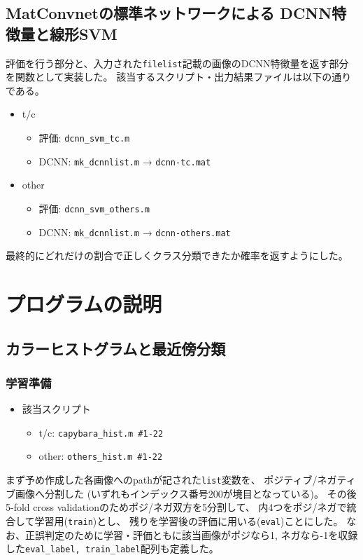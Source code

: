 \documentclass[11pt,a4paper, uplatex]{jsreport}
\begin{document}
\subsection{MatConvnetの標準ネットワークによる DCNN特徴量と線形SVM}\label{sec:defdcnn}
評価を行う部分と、入力された\texttt{filelist}記載の画像のDCNN特徴量を返す部分を関数として実装した。
該当するスクリプト・出力結果ファイルは以下の通りである。
\begin{itemize}
  \item t/c
  \begin{itemize}
    \item 評価: \texttt{dcnn_svm_tc.m}
    \item DCNN: \texttt{mk_dcnnlist.m} → \texttt{dcnn-tc.mat}
  \end{itemize}
  \item other
  \begin{itemize}
    \item 評価: \texttt{dcnn_svm_others.m}
    \item DCNN: \texttt{mk_dcnnlist.m} → \texttt{dcnn-others.mat}
  \end{itemize}
\end{itemize}
最終的にどれだけの割合で正しくクラス分類できたか確率を返すようにした。
\section{プログラムの説明}

\subsection{カラーヒストグラムと最近傍分類}\label{sec:descHist}
\subsubsection{学習準備}
\begin{itemize}
  \item 該当スクリプト
  \begin{itemize}
    \item t/c: \texttt{capybara_hist.m \#1-22}
    \item other: \texttt{others_hist.m \#1-22}
  \end{itemize}
\end{itemize}
まず予め作成した各画像へのpathが記された\texttt{list}変数を、
ポジティブ/ネガティブ画像へ分割した
(いずれもインデックス番号200が境目となっている)。
その後5-fold cross validationのためポジ/ネガ双方を5分割して、
内4つをポジ/ネガで統合して学習用(\texttt{train})とし、
残りを学習後の評価に用いる(\texttt{eval})ことにした。
なお、正誤判定のために学習・評価ともに該当画像がポジなら1,
ネガなら-1を収録した\texttt{eval_label, train_label}配列も定義した。
\end{document}
